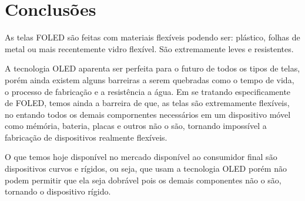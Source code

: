 \chapter{Conclusões}
\label{cap:conclusoes}

As telas FOLED são feitas com materiais flexíveis podendo ser: plástico, folhas de metal ou mais recentemente vidro flexível. São extremamente leves e resistentes.

A tecnologia OLED aparenta ser perfeita para o futuro de todos os tipos de telas, porém ainda existem alguns barreiras a serem quebradas como o tempo de vida, o processo de fabricação e a resistência a água. Em se tratando especificamente de FOLED, temos ainda a barreira de que, as telas são extremamente flexíveis, no entando todos os demais compornentes necessários em um dispositivo móvel como mémória, bateria, placas e outros não o são, tornando impossível a fabricação de dispositivos realmente flexíveis.

O que temos hoje disponível no mercado disponível ao consumidor final são dispositivos curvos e rígidos, ou seja, que usam a tecnologia OLED porém não podem permitir que ela seja dobrável pois os demais componentes não o são, tornando o dispositivo rígido.

